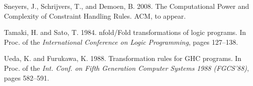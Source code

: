 \documentclass[final]{acmtrans2e}
\begin{document}
\begin{thebibliography}{}
{\sc Sneyers, J.}, {\sc Schrijvers, T.}, {\sc and}  {\sc Demoen, B.} 2008.
 \newblock The Computational Power and Complexity of Constraint Handling Rules.
  ACM, to appear.

{\sc Tamaki, H.} {\sc and} {\sc Sato, T.}  1984.
nfold/{F}old transformations of logic programs.
\newblock In Proc. of the {\em  {I}nternational {C}onference on {L}ogic
  {P}rogramming}, pages 127--138.

{\sc Ueda, K.} {\sc and} {\sc Furukawa, K.}  1988.
\newblock Transformation rules for {GHC} programs.
\newblock In Proc. of the {\em Int. Conf. on Fifth Generation Computer Systems 1988
  {(FGCS'88})}, pages 582--591.

\end{thebibliography}
\end{document}
